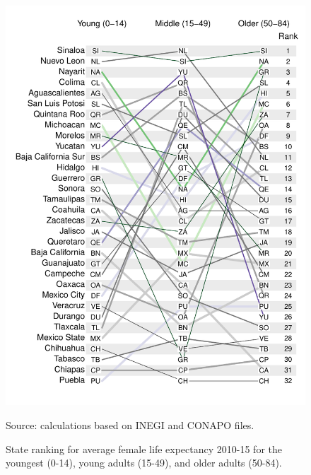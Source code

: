 \documentclass[11.5pt]{article}
\begin{document}
{\begin{figure}[h!]
\centering
\caption{State ranking for average female life expectancy 2010-15 for the youngest (0-14), young adults (15-49), and older adults (50-84).}
\label{rankFemales}
\includegraphics[scale=.50]{Figures/RankFemales.pdf}

Source: calculations based on INEGI and CONAPO files. 
\end{figure}

}
\end{document}
